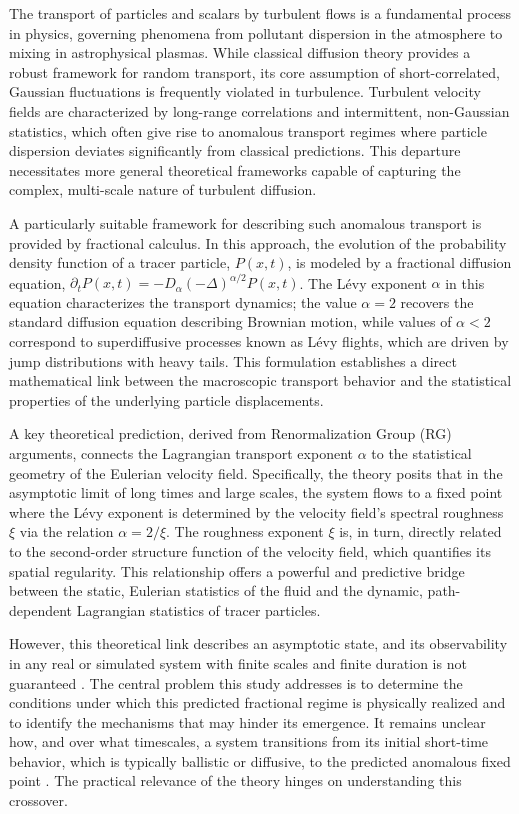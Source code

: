 \documentclass[]{article}
\begin{document}
The transport of particles and scalars by turbulent flows is a fundamental process in physics, governing phenomena from pollutant dispersion in the atmosphere to mixing in astrophysical plasmas. While classical diffusion theory provides a robust framework for random transport, its core assumption of short-correlated, Gaussian fluctuations is frequently violated in turbulence. Turbulent velocity fields are characterized by long-range correlations and intermittent, non-Gaussian statistics, which often give rise to anomalous transport regimes where particle dispersion deviates significantly from classical predictions. This departure necessitates more general theoretical frameworks capable of capturing the complex, multi-scale nature of turbulent diffusion.

A particularly suitable framework for describing such anomalous transport is provided by fractional calculus. In this approach, the evolution of the probability density function of a tracer particle, $P(x,t)$, is modeled by a fractional diffusion equation, $\partial_t P(x,t) = -D_\alpha(-\Delta)^{\alpha/2} P(x,t)$. The Lévy exponent $\alpha$ in this equation characterizes the transport dynamics; the value $\alpha=2$ recovers the standard diffusion equation describing Brownian motion, while values of $\alpha < 2$ correspond to superdiffusive processes known as Lévy flights, which are driven by jump distributions with heavy tails. This formulation establishes a direct mathematical link between the macroscopic transport behavior and the statistical properties of the underlying particle displacements.

A key theoretical prediction, derived from Renormalization Group (RG) arguments, connects the Lagrangian transport exponent $\alpha$ to the statistical geometry of the Eulerian velocity field. Specifically, the theory posits that in the asymptotic limit of long times and large scales, the system flows to a fixed point where the Lévy exponent is determined by the velocity field's spectral roughness $\xi$ via the relation $\alpha = 2/\xi$. The roughness exponent $\xi$ is, in turn, directly related to the second-order structure function of the velocity field, which quantifies its spatial regularity. This relationship offers a powerful and predictive bridge between the static, Eulerian statistics of the fluid and the dynamic, path-dependent Lagrangian statistics of tracer particles.

However, this theoretical link describes an asymptotic state, and its observability in any real or simulated system with finite scales and finite duration is not guaranteed \citep{onizawa2026finitetimeobservabilityoscillatoryinstabilities}. The central problem this study addresses is to determine the conditions under which this predicted fractional regime is physically realized and to identify the mechanisms that may hinder its emergence. It remains unclear how, and over what timescales, a system transitions from its initial short-time behavior, which is typically ballistic or diffusive, to the predicted anomalous fixed point \citep{onizawa2026finitetimeobservabilityoscillatoryinstabilities}. The practical relevance of the theory hinges on understanding this crossover.
\end{document}

